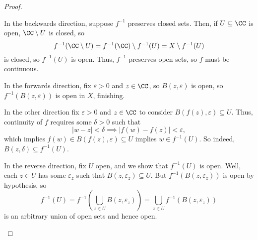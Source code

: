 \begin{proof}
\begin{listalph}
		In the backwards direction, suppose $f^{-1}$ preserves closed sets. Then, if $U\subseteq\CC$ is open, $\CC\setminus U$ is closed, so
		\[f^{-1}(\CC\setminus U)=f^{-1}(\CC)\setminus f^{-1}(U)=X\setminus f^{-1}(U)\]
		is closed, so $f^{-1}(U)$ is open. Thus, $f^{-1}$ preserves open sets, so $f$ must be continuous.

		\item In the forwards direction, fix $\varepsilon>0$ and $z\in\CC$, so $B(z,\varepsilon)$ is open, so $f^{-1}(B(z,\varepsilon))$ is open in $X$, finishing.
		
		In the other direction fix $\varepsilon>0$ and $z\in\CC$ to consider $B(f(z),\varepsilon)\subseteq U$. Thus, continuity of $f$ requires some $\delta>0$ such that
		\[|w-z|<\delta\implies|f(w)-f(z)|<\varepsilon,\]
		which implies $f(w)\in B(f(z),\varepsilon)\subseteq U$ implies $w\in f^{-1}(U)$. So indeed, $B(z,\delta)\subseteq f^{-1}(U)$.

		In the reverse direction, fix $U$ open, and we show that $f^{-1}(U)$ is open. Well, each $z\in U$ has some $\varepsilon_z$ such that $B(z,\varepsilon_z)\subseteq U$. But $f^{-1}(B(z,\varepsilon_z))$ is open by hypothesis, so
		\[f^{-1}(U)=f^{-1}\left(\bigcup_{z\in U}B(z,\varepsilon_z)\right)=\bigcup_{z\in U}f^{-1}(B(z,\varepsilon_z))\]
		is an arbitrary union of open sets and hence open.
		\qedhere
	\end{listalph}
\end{proof}

